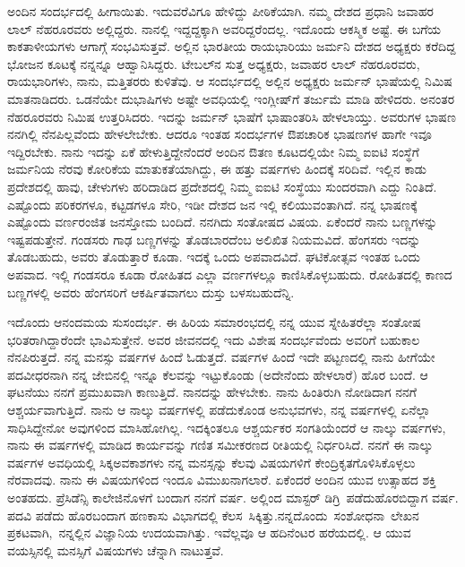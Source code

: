 \vskip 2pt

ಅಂದಿನ ಸಂದರ್ಭದಲ್ಲಿ ಹೀಗಾಯಿತು. ಇದುವರೆವಿಗೂ ಹೇಳಿದ್ದು ಪೀಠಿಕೆಯಾಗಿ. ನಮ್ಮ ದೇಶದ ಪ್ರಧಾನಿ ಜವಾಹರ ಲಾಲ್ ನೆಹರೂರವರು ಅಲ್ಲಿದ್ದರು. ನಾನಲ್ಲಿ ಇದ್ದದ್ದಕ್ಕಾಗಿ ಅವರಿದ್ದರೆಂದಲ್ಲ. ಇದೊಂದು ಆಕಸ್ಮಿಕ ಅಷ್ಟೆ. ಈ ಬಗೆಯ ಕಾಕತಾಳೀಯಗಳು ಆಗಾಗ್ಗೆ ಸಂಭವಿಸುತ್ತವೆ. ಅಲ್ಲಿನ ಭಾರತೀಯ ರಾಯಭಾರಿಯು ಜರ್ಮನಿ ದೇಶದ ಅಧ್ಯಕ್ಷರು ಕರೆದಿದ್ದ ಭೋಜನ ಕೂಟಕ್ಕೆ ನನ್ನನ್ನೂ ಆಹ್ವಾನಿಸಿದ್ದರು. ಟೇಬಲ್‍ನ ಸುತ್ತ ಅಧ್ಯಕ್ಷರು, ಜವಾಹರ ಲಾಲ್ ನೆಹರೂರವರು, ರಾಯಭಾರಿಗಳು, ನಾನು, ಮತ್ತಿತರರು ಕುಳಿತೆವು. ಆ ಸಂದರ್ಭದಲ್ಲಿ ಅಲ್ಲಿನ ಅಧ್ಯಕ್ಷರು ಜರ್ಮನ್ ಭಾಷೆಯಲ್ಲಿ  ನಿಮಿಷ ಮಾತನಾಡಿದರು. ಒಡನೆಯೇ ದುಭಾಷಿಗಳು ಅಷ್ಟೇ ಅವಧಿಯಲ್ಲಿ ಇಂಗ್ಲೀಷ್‌ಗೆ ತರ್ಜುಮೆ ಮಾಡಿ ಹೇಳಿದರು. ಅನಂತರ ನೆಹರೂರವರು  ನಿಮಿಷ ಉತ್ತರಿಸಿದರು. ಇದನ್ನು ಜರ್ಮನ್ ಭಾಷೆಗೆ ಭಾಷಾಂತರಿಸಿ ಹೇಳಲಾಯ್ತು. ಅವರುಗಳ ಭಾಷಣ ನನಗಿಲ್ಲಿ ನೆನಪಿಲ್ಲವೆಂದು ಹೇಳಲೇಬೇಕು. ಆದರೂ ಇಂತಹ ಸಂದರ್ಭಗಳ ಔಪಚಾರಿಕ ಭಾಷಣಗಳ ಹಾಗೇ ಇವೂ ಇದ್ದಿರಬೇಕು. ನಾನು ಇದನ್ನು ಏಕೆ ಹೇಳುತ್ತಿದ್ದೇನೆಂದರೆ ಅಂದಿನ ಔತಣ ಕೂಟದಲ್ಲಿಯೇ ನಿಮ್ಮ ಐಐಟಿ ಸಂಸ್ಥೆಗೆ ಜರ್ಮನಿಯ ನೆರವು ಕೋರಿಕೆಯ ಮಾತುಕತೆಯಾಗಿದ್ದು, ಈ ಹತ್ತು ವರ್ಷಗಳು ಹಿಂದಕ್ಕೆ ಸರಿದಿವೆ. ಇಲ್ಲಿನ ಕಾಡು ಪ್ರದೇಶದಲ್ಲಿ ಹಾವು, ಚೇಳುಗಳು ಹರಿದಾಡಿದ ಪ್ರದೇಶದಲ್ಲಿ ನಿಮ್ಮ ಐಐಟಿ ಸಂಸ್ಥೆಯು ಸುಂದರವಾಗಿ ಎದ್ದು ನಿಂತಿದೆ. ಎಷ್ಟೊಂದು ಪರಿಕರಗಳೂ, ಕಟ್ಟಡಗಳೂ ಸೇರಿ, ಇಡೀ ದೇಶದ ಜನ ಇಲ್ಲಿ ಕಲಿಯುವಂತಾಗಿದೆ. ನನ್ನ ಭಾಷಣಕ್ಕೆ ಎಷ್ಟೊಂದು ವರ್ಣರಂಜಿತ ಜನಸ್ತೋಮ ಬಂದಿದೆ. ನನಗಿದು ಸಂತೋಷದ ವಿಷಯ. ಏಕೆಂದರೆ ನಾನು ಬಣ್ಣಗಳನ್ನು ಇಷ್ಟಪಡುತ್ತೇನೆ. ಗಂಡಸರು ಗಾಢ ಬಣ್ಣಗಳನ್ನು ತೊಡಬಾರದೆಂಬ ಅಲಿಖಿತ ನಿಯಮವಿದೆ. ಹೆಂಗಸರು ಇದನ್ನು ತೊಡಬಹುದು, ಅವರು ತೊಡುತ್ತಾರೆ ಕೂಡಾ. ಇದಕ್ಕೆ ಒಂದು ಅಪವಾದವಿದೆ. ಘಟಿಕೋತ್ಸವ ಇಂತಹ ಒಂದು ಅಪವಾದ. ಇಲ್ಲಿ ಗಂಡಸರೂ ಕೂಡಾ ರೋಹಿತದ ಎಲ್ಲಾ ವರ್ಣಗಳಲ್ಲೂ ಕಾಣಿಸಿಕೊಳ್ಳಬಹುದು. ರೋಹಿತದಲ್ಲಿ ಕಾಣದ ಬಣ್ಣಗಳಲ್ಲಿ ಅವರು ಹೆಂಗಸರಿಗೆ ಆಕರ್ಷಿತವಾಗಲು ದುಸ್ತು ಬಳಸಬಹುದೆನ್ನಿ.


ಇದೊಂದು ಆನಂದಮಯ ಸುಸಂದರ್ಭ. ಈ ಹಿರಿಯ ಸಮಾರಂಭದಲ್ಲಿ ನನ್ನ ಯುವ ಸ್ನೇಹಿತರೆಲ್ಲಾ ಸಂತೋಷ ಭರಿತರಾಗಿದ್ದಾರೆಂದೇ ಭಾವಿಸುತ್ತೇನೆ. ಅವರ ಜೀವನದಲ್ಲಿ ಇದು ವಿಶೇಷ ಸಂದರ್ಭವೆಂದು ಅವರಿಗೆ ಬಹುಕಾಲ ನೆನಪಿರುತ್ತದೆ. ನನ್ನ ಮನಸ್ಸು  ವರ್ಷಗಳ ಹಿಂದೆ ಓಡುತ್ತದೆ.  ವರ್ಷಗಳ ಹಿಂದೆ ಇದೇ ಪಟ್ಟಣದಲ್ಲಿ ನಾನು ಹೀಗೆಯೇ ಪದವೀಧರನಾಗಿ ನನ್ನ ಜೇಬಿನಲ್ಲಿ ಇನ್ನೂ ಕೆಲವನ್ನು ಇಟ್ಟುಕೊಂಡು (ಅದೇನೆಂದು ಹೇಳಲಾರೆ) ಹೊರ ಬಂದೆ. ಆ ಘಟನೆಯು ನನಗೆ ಪ್ರಮುಖವಾಗಿ ಕಾಣುತ್ತಿದೆ. ನಾನದನ್ನು ಹೇಳಬೇಕು. ನಾನು ಹಿಂತಿರುಗಿ ನೋಡಿದಾಗ ನನಗೆ ಆಶ್ಚರ್ಯವಾಗುತ್ತಿದೆ. ನಾನು ಆ ನಾಲ್ಕು ವರ್ಷಗಳಲ್ಲಿ ಪಡೆದುಕೊಂಡ ಅನುಭವಗಳು, ನನ್ನ \break ವರ್ಷಗಳಲ್ಲಿ ಏನೆಲ್ಲಾ ಸಾಧಿಸಿದ್ದೇನೋ ಅವುಗಳಿಂದ ಮಾಸಿಹೋಗಿಲ್ಲ. ಇದಕ್ಕಿಂತಲೂ ಆಶ್ಚರ್ಯಕರ ಸಂಗತಿಯೆಂದರೆ ಆ ನಾಲ್ಕು ವರ್ಷಗಳು, ನಾನು ಈ  ವರ್ಷಗಳಲ್ಲಿ ಮಾಡಿದ ಕಾರ್ಯವನ್ನು ಗಣಿತ ಸಮೀಕರಣದ ರೀತಿಯಲ್ಲಿ ನಿರ್ಧರಿಸಿದೆ. ನನಗೆ ಈ ನಾಲ್ಕು ವರ್ಷಗಳ ಅವಧಿಯಲ್ಲಿ ಸಿಕ್ಕ\break ಅವಕಾಶಗಳು ನನ್ನ ಮನಸ್ಸನ್ನು ಕೆಲವು ವಿಷಯಗಳಿಗೆ ಕೇಂದ್ರಿಕೃತಗೊಳಿಸಿಕೊಳ್ಳಲು ನೆರವಾದವು. ನಾನು ಈ ವಿಷಯಗಳಿಂದ ಇಂದೂ ವಿಮುಖನಾಗಲಾರೆ. ಏಕೆಂದರೆ ಅಂದಿನ ಯುವ ಉತ್ಸಾಹದ ಶಕ್ತಿ ಅಂತಹದು. ಪ್ರೆಸಿಡೆನ್ಸಿ ಕಾಲೇಜಿನೊಳಗೆ ಬಂದಾಗ ನನಗೆ  ವರ್ಷ. ಅಲ್ಲಿಂದ ಮಾಸ್ಟರ್ ಡಿಗ್ರಿ~ಪಡೆದು\break ಹೊರಬಿದ್ದಾಗ  ವರ್ಷ. ಪದವಿ ಪಡೆದು ಹೊರಬಂದಾಗ ಹಣಕಾಸು ವಿಭಾಗದಲ್ಲಿ ಕೆಲಸ~ಸಿಕ್ಕಿತ್ತು.\break ನನ್ನದೊಂದು~ಸಂಶೋಧನಾ~ಲೇಖನ ಪ್ರಕಟವಾಗಿ,~ನನ್ನಲ್ಲಿನ ವಿಜ್ಞಾನಿಯ ಉದಯವಾಗಿತ್ತು. ಇವೆಲ್ಲವೂ  ಆ ಹದಿನೆಂಟರ ಹರೆಯದಲ್ಲಿ. ಆ ಯುವ ವಯಸ್ಸಿನಲ್ಲಿ ಮನಸ್ಸಿಗೆ ವಿಷಯಗಳು ಚೆನ್ನಾಗಿ ನಾಟುತ್ತವೆ.

